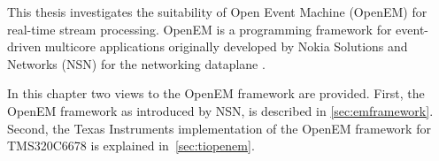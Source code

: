 This thesis investigates the suitability of Open Event Machine (OpenEM) for real-time stream processing. OpenEM is a programming framework for event-driven multicore applications originally developed by Nokia Solutions and Networks (NSN) for the networking dataplane \cite{openeminto}. 

In this chapter two views to the OpenEM framework are provided. First, the OpenEM framework as introduced by NSN, is described in \ref{sec:emframework}. Second, the Texas Instruments implementation of the OpenEM framework for TMS320C6678 is explained in~\ref{sec:tiopenem}.

